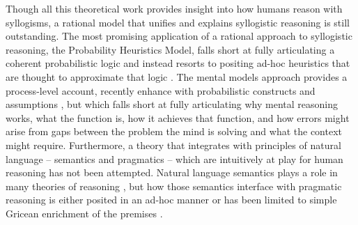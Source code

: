 \documentclass[floatsintext, doc]{apa6}
\begin{document}
Though all this theoretical work provides insight into how humans reason with syllogisms, a rational model that unifies and explains syllogistic reasoning is still outstanding. 
The most promising application of a rational approach to syllogistic reasoning, the Probability Heuristics Model, falls short at fully articulating a coherent probabilistic logic and instead resorts to positing ad-hoc heuristics that are thought to approximate that logic \cite{Chater1999}.
The mental models approach provides a process-level account, recently enhance with probabilistic constructs and assumptions \cite{johnson2015logic}, but which falls short at fully articulating why mental reasoning works, what the function is, how it achieves that function,  and how errors might arise from gaps between the problem the mind is solving and what the context might require.
Furthermore, a theory that integrates with principles of natural language -- semantics and pragmatics -- which are intuitively at play for human reasoning \cite{sperber1986relevance,mercier2017enigma} has not been attempted.
Natural language semantics plays a role in many theories of reasoning \cite{JL1978, Khemlani2012, geurts2003reasoning}, but how those semantics interface with pragmatic reasoning  is either posited in an ad-hoc manner \cite{Chater1999} or has been limited to simple Gricean enrichment of the premises \cite{Roberts2001}.	






\end{document}
